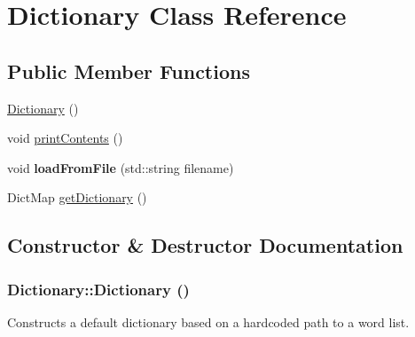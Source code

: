 \hypertarget{classDictionary}{
\section{Dictionary Class Reference}
\label{classDictionary}
}
\subsection*{Public Member Functions}
\begin{DoxyCompactItemize}
\item 
\hyperlink{classDictionary_aee8d612bc9d323c38faba045ba384b8b}{Dictionary} ()
\item 
void \hyperlink{classDictionary_a2dbee36571908c93d96cfe885f25272e}{printContents} ()
\item 
\hypertarget{classDictionary_afeca5aa092a92aec62224e720e2304d2}{
void {\bfseries loadFromFile} (std::string filename)}
\label{classDictionary_afeca5aa092a92aec62224e720e2304d2}

\item 
DictMap \hyperlink{classDictionary_a9696c9da75da8f8bfd1a1e2ff071c343}{getDictionary} ()
\end{DoxyCompactItemize}


\subsection{Constructor \& Destructor Documentation}
\hypertarget{classDictionary_aee8d612bc9d323c38faba045ba384b8b}{
\subsubsection[{Dictionary}]{\setlength{\rightskip}{0pt plus 5cm}Dictionary::Dictionary ()}}
\label{classDictionary_aee8d612bc9d323c38faba045ba384b8b}
Constructs a default dictionary based on a hardcoded path to a word list. 

